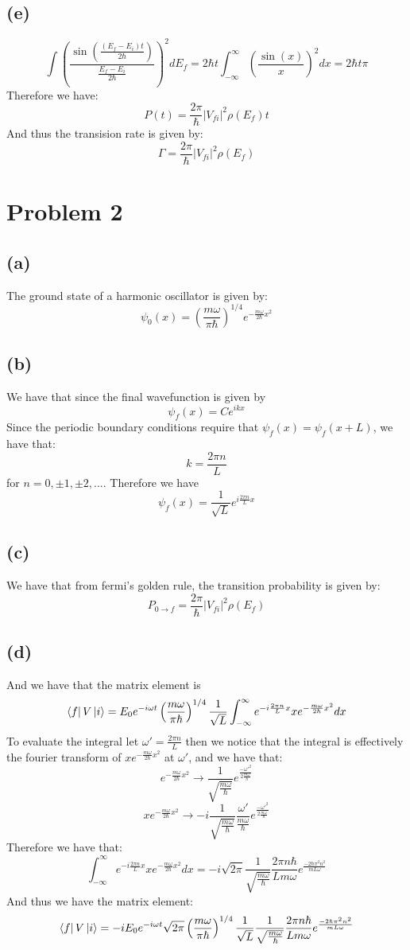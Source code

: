 \documentclass[11pt]{article}
\begin{document}
\subsection*{(e)}
$$\int \left(\frac{\sin\left(\frac{(E_{f}-E_i)t}{2\hbar}\right)}{\frac{E_f-E_i}{2\hbar}}\right)^2dE_f = 2\hbar t \int_{-\infty}^{\infty} \left(\frac{\sin(x)}{x}\right)^2dx=2\hbar t\pi$$
Therefore we have:
$$P(t) = \frac{2\pi}{\hbar}|V_{fi}|^2\rho(E_f)t$$
And thus the transision rate is given by:
$$\Gamma = \frac{2\pi}{\hbar}|V_{fi}|^2\rho(E_f)$$
\section*{Problem 2}
\subsection*{(a)}
The ground state of a harmonic oscillator is given by:
$$\psi_0(x) = \left(\frac{m\omega}{\pi\hbar}\right)^{1/4}e^{-\frac{m\omega}{2\hbar}x^2}$$
\subsection*{(b)}
We have that since the final wavefunction is given by 
$$\psi_f(x) = Ce^{ikx}$$
Since the periodic boundary conditions require that $\psi_f(x) = \psi_f(x+L)$, we have that:
$$k = \frac{2\pi n}{L}$$
for $n = 0, \pm 1, \pm 2, ...$.
Therefore we have 
$$\psi_f(x) = \frac{1}{\sqrt{L}}e^{i\frac{2\pi n}{L}x}$$
\subsection*{(c)}
We have that from fermi's golden rule, the transition probability is given by:
$$P_{0\rightarrow f} = \frac{2\pi}{\hbar}|V_{fi}|^2\rho(E_f)$$
\subsection*{(d)}
And we have that the matrix element is 
$$\bra{f} V \ket{i} = E_0e^{-i\omega t}\left(\frac{m\omega}{\pi\hbar}\right)^{1/4}\frac{1}{\sqrt{L}}\int_{-\infty}^{\infty} e^{-i\frac{2\pi n}{L}x}xe^{-\frac{m\omega}{2\hbar}x^2}dx$$
To evaluate the integral let $\omega' = \frac{2\pi n}{L}$ then we notice that the 
integral is effectively the fourier transform of $xe^{-\frac{m\omega}{2\hbar}x^2}$ at $\omega'$, and we have that:
$$e^{-\frac{m\omega}{2\hbar}x^2} \to \frac{1}{\sqrt{\frac{m\omega}{\hbar}}}e^{\frac{-\omega'^2}{2\frac{m\omega}{\hbar}}}$$
$$xe^{-\frac{m\omega}{2\hbar}x^2} \to -i\frac{1}{\sqrt{\frac{m\omega}{\hbar}}}\frac{\omega'}{\frac{m\omega}{\hbar}}e^{\frac{-\omega'^2}{2\frac{m\omega}{\hbar}}}$$
Therefore we have that:
$$\int_{-\infty}^{\infty} e^{-i\frac{2\pi n}{L}x}xe^{-\frac{m\omega}{2\hbar}x^2}dx = -i\sqrt{2\pi}\frac{1}{\sqrt{\frac{m\omega}{\hbar}}}\frac{2\pi n \hbar}{Lm\omega}e^{\frac{-2\hbar \pi^2 n^2}{mL\omega}}$$
And thus we have the matrix element:
$$\bra{f} V \ket{i} =-iE_0e^{-i\omega t} \sqrt{2\pi}\left(\frac{m\omega}{\pi\hbar}\right)^{1/4}\frac{1}{\sqrt{L}}\frac{1}{\sqrt{\frac{m\omega}{\hbar}}}\frac{2\pi n \hbar}{Lm\omega}e^{\frac{-2\hbar \pi^2 n^2}{mL\omega}}$$
\end{document}
